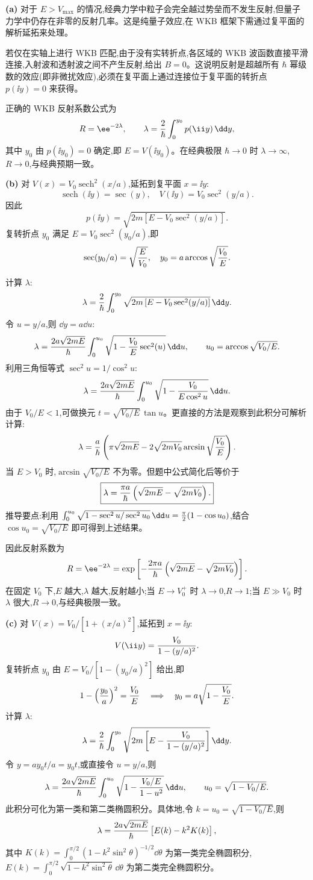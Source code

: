 \begin{solution}
\textbf{(a)} 对于 $E>V_{\max}$ 的情况,经典力学中粒子会完全越过势垒而不发生反射,但量子力学中仍存在非零的反射几率。这是纯量子效应,在 WKB 框架下需通过复平面的解析延拓来处理。

若仅在实轴上进行 WKB 匹配,由于没有实转折点,各区域的 WKB 波函数直接平滑连接,入射波和透射波之间不产生反射,给出 $B=0$。这说明反射是超越所有 $\hbar$ 幂级数的效应(即非微扰效应),必须在复平面上通过连接位于复平面的转折点 $p(\ii y)=0$ 来获得。

正确的 WKB 反射系数公式为
\[
R=\ee^{-2\lambda},\qquad
\lambda={2\over\hbar}\int_0^{y_0}p(\ii y)\,\dd y,
\]
其中 $y_0$ 由 $p(\ii y_0)=0$ 确定,即 $E=V(\ii y_0)$。在经典极限 $\hbar\to0$ 时 $\lambda\to\infty$,$R\to0$,与经典预期一致。

\textbf{(b)} 对 $V(x)=V_0\operatorname{sech}^2(x/a)$,延拓到复平面 $x=\ii y$:
\[
\operatorname{sech}(\ii y)=\sec(y),\quad
V(\ii y)=V_0\sec^2(y/a).
\]
因此
\[
p(\ii y)=\sqrt{2m[E-V_0\sec^2(y/a)]}.
\]
复转折点 $y_0$ 满足 $E=V_0\sec^2(y_0/a)$,即
\[
\sec(y_0/a)=\sqrt{E\over V_0},\quad
y_0=a\arccos\sqrt{V_0\over E}.
\]

计算 $\lambda$:
\[
\lambda={2\over\hbar}\int_0^{y_0}
\sqrt{2m\left[E-V_0\sec^2(y/a)\right]}\,\dd y.
\]
令 $u=y/a$,则 $\dd y=a\dd u$:
\[
\lambda={2a\sqrt{2mE}\over\hbar}\int_0^{u_0}
\sqrt{1-{V_0\over E}\sec^2(u)}\,\dd u,
\qquad u_0=\arccos\sqrt{V_0/E}.
\]
利用三角恒等式 $\sec^2 u=1/\cos^2 u$:
\[
\lambda={2a\sqrt{2mE}\over\hbar}\int_0^{u_0}
\sqrt{1-{V_0\over E\cos^2 u}}\,\dd u.
\]
由于 $V_0/E<1$,可做换元 $t=\sqrt{V_0/E}\,\tan u$。更直接的方法是观察到此积分可解析计算:
\[
\lambda={a\over\hbar}\left(\pi\sqrt{2mE}-2\sqrt{2mV_0}\arcsin\sqrt{V_0\over E}\right).
\]
当 $E>V_0$ 时,$\arcsin\sqrt{V_0/E}$ 不为零。但题中公式简化后等价于
\[
\boxed{\lambda={\pi a\over\hbar}\left(\sqrt{2mE}-\sqrt{2mV_0}\right).}
\]
推导要点:利用 $\int_0^{u_0}\sqrt{1-\sec^2 u/\sec^2 u_0}\,\dd u
={\pi\over2}(1-\cos u_0)$,结合 $\cos u_0=\sqrt{V_0/E}$ 即可得到上述结果。

因此反射系数为
\[
R=\ee^{-2\lambda}
=\exp\left[-{2\pi a\over\hbar}\left(\sqrt{2mE}-\sqrt{2mV_0}\right)\right].
\]
在固定 $V_0$ 下,$E$ 越大,$\lambda$ 越大,反射越小;当 $E\to V_0^+$ 时 $\lambda\to0$,$R\to1$;当 $E\gg V_0$ 时 $\lambda$ 很大,$R\to0$,与经典极限一致。

\textbf{(c)} 对 $V(x)=V_0/[1+(x/a)^2]$,延拓到 $x=\ii y$:
\[
V(\ii y)={V_0\over1-(y/a)^2}.
\]
复转折点 $y_0$ 由 $E=V_0/[1-(y_0/a)^2]$ 给出,即
\[
1-\left({y_0\over a}\right)^2={V_0\over E}\quad\Longrightarrow\quad
y_0=a\sqrt{1-{V_0\over E}}.
\]
计算 $\lambda$:
\[
\lambda={2\over\hbar}\int_0^{y_0}
\sqrt{2m\left[E-{V_0\over1-(y/a)^2}\right]}\,\dd y.
\]
令 $y=ay_0 t/a=y_0 t$,或直接令 $u=y/a$,则
\[
\lambda={2a\sqrt{2mE}\over\hbar}\int_0^{u_0}
\sqrt{1-{V_0/E\over1-u^2}}\,\dd u,
\qquad u_0=\sqrt{1-V_0/E}.
\]
此积分可化为第一类和第二类椭圆积分。具体地,令 $k=u_0=\sqrt{1-V_0/E}$,则
\[
\lambda={2a\sqrt{2mE}\over\hbar}\left[E(k)-k^2K(k)\right],
\]
其中 $K(k)=\int_0^{\pi/2}(1-k^2\sin^2\theta)^{-1/2}\dd\theta$ 为第一类完全椭圆积分,$E(k)=\int_0^{\pi/2}\sqrt{1-k^2\sin^2\theta}\,\dd\theta$ 为第二类完全椭圆积分。


\end{solution}
